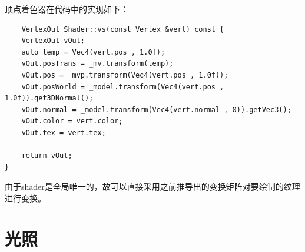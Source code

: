 \begin{spacing}{2.5}
    顶点着色器在代码中的实现如下：
        \end{spacing}

        
    \begin{lstlisting}
    VertexOut Shader::vs(const Vertex &vert) const {
    VertexOut vOut;
    auto temp = Vec4(vert.pos , 1.0f);
    vOut.posTrans = _mv.transform(temp);
    vOut.pos = _mvp.transform(Vec4(vert.pos , 1.0f));
    vOut.posWorld = _model.transform(Vec4(vert.pos , 1.0f)).get3DNormal();
    vOut.normal = _model.transform(Vec4(vert.normal , 0)).getVec3();
    vOut.color = vert.color;
    vOut.tex = vert.tex;
    
    return vOut;
}
    \end{lstlisting}
            \begin{spacing}{2.5}
            	由于shader是全局唯一的，故可以直接采用之前推导出的变换矩阵对要绘制的纹理进行变换。
            \end{spacing}
    \section{光照}

